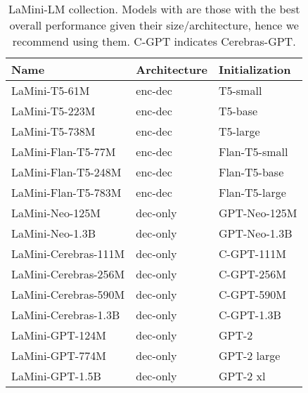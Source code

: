 \documentclass[11pt]{article}
\newcommand{\modelname}{LaMini\xspace}
\newcommand{\modelnamefull}{LaMini-LM\xspace}
\begin{document}
\begin{table}[t]
    \centering
    \small
    \setlength{\tabcolsep}{4pt}
    \begin{tabular}{@{}lll@{}}
    \toprule
    Name                                                      & Architecture    & Initialization     \\ \midrule
    \modelname-T5-61M                                         & enc-dec & T5-small           \\
    \modelname-T5-223M                                        & enc-dec & T5-base            \\
    \modelname-T5-738M                                        & enc-dec & T5-large           \\ \midrule
    \modelname-Flan-T5-77M\textsuperscript{\rlap{}}  & enc-dec & Flan-T5-small      \\
    \modelname-Flan-T5-248M\textsuperscript{\rlap{}} & enc-dec & Flan-T5-base       \\
    \modelname-Flan-T5-783M\textsuperscript{\rlap{}} & enc-dec & Flan-T5-large      \\ \midrule
\modelname-Neo-125M                                   & dec-only & GPT-Neo-125M \\
    \modelname-Neo-1.3B                                   & dec-only & GPT-Neo-1.3B \\ \midrule
\modelname-Cerebras-111M                                  & dec-only    & C-GPT-111M \\
    \modelname-Cerebras-256M                                  & dec-only    & C-GPT-256M \\
    \modelname-Cerebras-590M                                  & dec-only    & C-GPT-590M \\
    \modelname-Cerebras-1.3B                                  & dec-only    & C-GPT-1.3B \\ \midrule
    \modelname-GPT-124M\textsuperscript{\rlap{}}     & dec-only    & GPT-2              \\
    \modelname-GPT-774M\textsuperscript{\rlap{}}     & dec-only    & GPT-2 large        \\
    \modelname-GPT-1.5B\textsuperscript{\rlap{}}     & dec-only    & GPT-2 xl           \\ \bottomrule
    \end{tabular}   
    \caption{
        \modelnamefull collection. 
        Models with  are those with the best overall performance given their size/architecture, hence we recommend using them.
        C-GPT indicates Cerebras-GPT.
}
\end{table}
\end{document}
